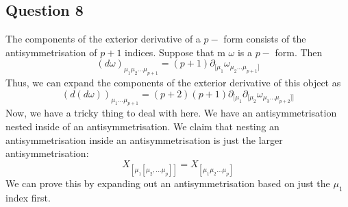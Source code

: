 \subsection{Question 8} 
The components of the exterior derivative of a $ p-$ form consists of the antisymmetrisation of 
$ p + 1 $ indices. Suppose that m $ \omega $ is a $ p- $ form. Then 
\[
( d\omega  )_{\mu_{1} \mu_2 \dots \mu_{p + 1 }} = ( p + 1 ) \partial_{[  \mu_1} \omega_{ \mu_2 \dots \mu_{ p + 1} ] } 	
\] Thus, we can expand the components of the exterior derivative of this object as 
\[
	( d ( d \omega  ))_{ \mu_1 \dots \mu_{p + 1}} = ( p + 2 )( p + 1) \partial_{ [ \mu_1 } \partial_{ [  \mu_2 } \omega _{\mu_3 \dots \mu_{ p + 2 } ]]  }
\] Now, we have a tricky thing to deal with here. 
We have an antisymmetrisation nested inside of an antisymmetrisation. 
We claim that nesting an antisymmetrisation inside an antisymmetrisation 
is just the larger antisymmetrisation: 
\[
X_{ [ \mu_1 [ \mu_2 , \dots \mu_{ p } ]] } = X_{[ \mu_1 \mu_2 \dots \mu_{ p}]}
\] We can prove this by expanding out an antisymmetrisation based on 
just the $ \mu_1 $ index first. 

